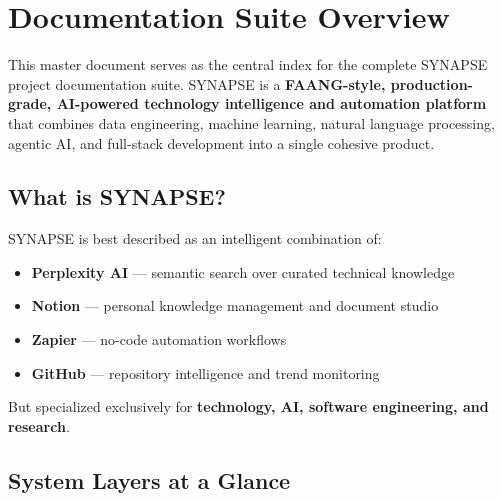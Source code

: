 \documentclass[12pt,a4paper]{report}
\begin{document}
\chapter*{Documentation Suite Overview}

This master document serves as the central index for the complete SYNAPSE project
documentation suite. SYNAPSE is a \textbf{FAANG-style, production-grade, AI-powered
technology intelligence and automation platform} that combines data engineering,
machine learning, natural language processing, agentic AI, and full-stack development
into a single cohesive product.

\section*{What is SYNAPSE?}

SYNAPSE is best described as an intelligent combination of:

\begin{itemize}[leftmargin=2em]
    \item \textbf{Perplexity AI} --- semantic search over curated technical knowledge
    \item \textbf{Notion} --- personal knowledge management and document studio
    \item \textbf{Zapier} --- no-code automation workflows
    \item \textbf{GitHub} --- repository intelligence and trend monitoring
\end{itemize}

\noindent But specialized exclusively for \textbf{technology, AI, software engineering, and research}.

\section*{System Layers at a Glance}
\end{document}
